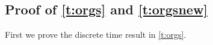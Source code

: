 \documentclass[12pt,reqno]{amsart}
\numberwithin{equation}{section}
\theoremstyle{definition}
\newcommand{\1}{\mathbbm{1}}
\newcommand{\PP}{\mathbb P}
\newcommand{\precsd}{\preceq_{\textrm{sd}}}
\begin{document}





\subsection{Proof of 
    \texorpdfstring{\cref{t:orgs}}{Theorem \ref{t:orgs}} and
    \texorpdfstring{\cref{t:orgsnew}}{Theorem \ref{t:orgsnew}}
}

First we prove the discrete time result in \cref{t:orgs}.
\end{document}
